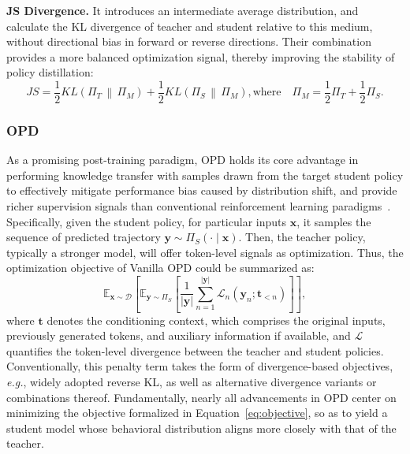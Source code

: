 \documentclass[]{jingdong}
\theoremstyle{plain}
\theoremstyle{definition}
\theoremstyle{remark}
\begin{document}
\noindent\textbf{JS Divergence.}
It introduces an intermediate average distribution, and calculate the KL divergence of teacher and student relative to this medium, without directional bias in forward or reverse directions. 
Their combination provides a more balanced optimization signal, thereby improving the stability of policy distillation:
\begin{equation}
    JS = \frac{1}{2} KL\left( \Pi_T \,\middle\|\, \Pi_M \right) + \frac{1}{2}KL\left(\Pi_S\,\middle\|\,\Pi_M\right),
    \text{where} \quad \Pi_M = \frac{1}{2} \Pi_T + \frac{1}{2} \Pi_S.
\end{equation}



\subsubsection{OPD}
As a promising post-training paradigm, OPD holds its core advantage in performing knowledge transfer with samples drawn from the target student policy to effectively mitigate performance bias caused by distribution shift, and provide richer supervision signals than conventional reinforcement learning paradigms~\citep{thinking2025opd,song2026survey,li2026rethinking}. Specifically, given the student policy, for particular inputs $\mathbf{x}$, it samples the sequence of predicted trajectory $\mathbf{y}\sim\Pi_{S}\left(\cdot\mid\mathbf{x}\right)$. Then, the teacher policy, typically a stronger model, will offer token-level signals as optimization. Thus, the optimization objective of Vanilla OPD could be summarized as:
\begin{equation}
    \mathbb{E}_{\mathbf{x} \sim \mathcal{D}}\left[\mathbb{E}_{\mathbf{y} \sim \Pi_{S}}\left[\frac{1}{|\mathbf{y}|} \sum_{n=1}^{|\mathbf{y}|} \mathcal{L}_{n}\left(\mathbf{y}_{n} ; \mathbf{t}_{<n}\right)\right]\right],
    \label{eq:objective}
\end{equation}
where $\mathbf{t}$ denotes the conditioning context, which comprises the original inputs, previously generated tokens, and auxiliary information if available, and $\mathcal{L}$ quantifies the token-level divergence between the teacher and student policies. Conventionally, this penalty term takes the form of divergence-based objectives, \textit{e.g.}, widely adopted reverse KL, as well as alternative divergence variants or combinations thereof. Fundamentally, nearly all advancements in OPD center on minimizing the objective formalized in Equation~\ref{eq:objective}, so as to yield a student model whose behavioral distribution aligns more closely with that of the teacher.
\end{document}
